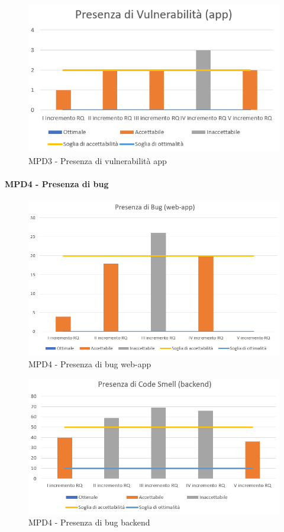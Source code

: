   \begin{figure}[h!]
    \centering
      \includegraphics[scale=1]{Immagini/Vuln APP.PNG}
    \caption{MPD3 - Presenza di vulnerabilità app}
  \end{figure}



  \newpage
  \paragraph{MPD4 - Presenza di bug}
  \begin{figure}[h!]
    \centering
      \includegraphics[scale=1]{Immagini/Bug WA.PNG}
    \caption{MPD4 - Presenza di bug web-app}
  \end{figure}

  \begin{figure}[h!]
    \centering
      \includegraphics[scale=1]{Immagini/CodeSmell BE.PNG}
    \caption{MPD4 - Presenza di bug backend}
  \end{figure}

